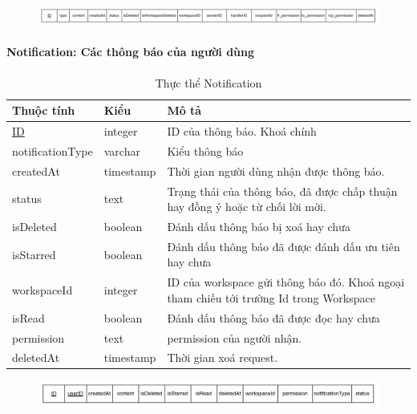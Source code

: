 \begin{figure}[H]
        \centering
        \includegraphics[width=\textwidth]{Content/Phân tích và thiết kế hệ thống/images/ERD_mapping/request_mapping.png}
        \label{fig:Thực thể request}
\end{figure}

\paragraph{Notification: Các thông báo của người dùng}
\begin{center}
\begin{table}
        \begin{tabular}{ |p{3cm} |p{3cm} |p{9cm}|} 
                \hline
                   Thuộc tính & Kiểu & Mô tả \\ [0.5ex] 
                \hline
                \underline{ID} & integer & ID của thông báo. Khoá chính \\ 
                \hline
                notificationType & varchar & Kiểu thông báo \\
                \hline
                createdAt & timestamp & Thời gian người dùng nhận được thông báo.\\
                \hline
                status & text & Trạng thái của thông báo, đã được chấp thuận hay đồng ý hoặc từ chối lời mời.\\
                \hline
                isDeleted & boolean & Đánh dấu thông báo bị xoá hay chưa \\
                \hline
                isStarred & boolean & Đánh dấu thông báo đã được đánh dấu ưu tiên hay chưa \\
                \hline
                workspaceId & integer & ID của workspace gửi thông báo đó. Khoá ngoại tham chiếu tới trường Id trong Workspace \\
                \hline
                 isRead & boolean & Đánh dấu thông báo đã được đọc hay chưa \\
                \hline
                 permission & text & permission của người nhận. \\
                \hline
                 deletedAt & timestamp & Thời gian xoá request. \\
                \hline
               \end{tabular}
                        \caption{Thực thể Notification}
\end{table}
\end{center}
\begin{figure}[H]
        \centering
        \includegraphics[width=\textwidth]{Content/Phân tích và thiết kế hệ thống/images/ERD_mapping/notification_mapping.png}
        \label{fig:Thực thể Notification}
\end{figure}